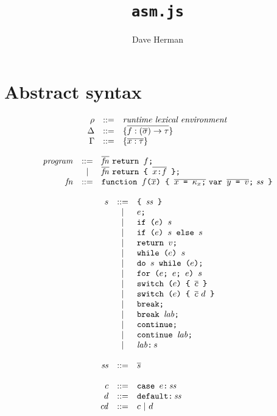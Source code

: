\documentclass{article}
\newcommand{\funty}[2]{({#1}) \rightarrow {#2}}
\newcommand{\seq}[1]{\overline{{#1}}}
\newcommand{\mathjs}[1]{\mbox{\texttt{{#1}}}}
\newcommand{\return}[1]{\mathjs{return }{#1}\mathjs{;}}
\newcommand{\fun}[3]{\mathjs{function }{#1}\mathjs{(}{#2}\mathjs{) \{ }{#3}\mathjs{ \}}}
\newcommand{\var}[1]{\mathjs{var }{#1}\mathjs{;}}
\newcommand{\while}[2]{\mathjs{while (}{#1}\mathjs{) }{#2}}
\newcommand{\dowhile}[2]{\mathjs{do }{#1}\mathjs{ while (}{#2}\mathjs{);}}
\newcommand{\for}[4]{\mathjs{for (}{#1}\mathjs{; }{#2}\mathjs{; }{#3}\mathjs{) }{#4}}
\newcommand{\switch}[2]{\mathjs{switch (}{#1}\mathjs{) \{ }{#2}\mathjs{ \}}}
\newcommand{\brk}{\mathjs{break;}}
\newcommand{\brkl}[1]{\mathjs{break }{#1}\mathjs{;}}
\newcommand{\cont}{\mathjs{continue;}}
\newcommand{\contl}[1]{\mathjs{continue }{#1}\mathjs{;}}
\newcommand{\lab}[2]{{#1}\mathjs{:}\,{#2}}
\newcommand{\ifthen}[2]{\mathjs{if (}{#1}\mathjs{) }{#2}}
\newcommand{\ifthenelse}[3]{\mathjs{if (}{#1}\mathjs{) }{#2}\mathjs{ else }{#3}}
\newcommand{\block}[1]{\mathjs{\{ }{#1}\mathjs{ \}}}
\begin{document}
\title{\texttt{asm.js}}
\author{Dave Herman}
\maketitle

\section{Abstract syntax}

\[
\begin{array}{rcl}
\rho & ::= & \mbox{\textit{runtime lexical environment}} \\
\Delta & ::= & \{ \seq{f : \funty{\seq{\sigma}}{\tau} } \} \\
\Gamma & ::= & \{ \seq{x : \tau} \} \\
\end{array}
\]

\[
\begin{array}{rcl}
\mathit{program} & ::= & \seq{\mathit{fn}}\ \return{f} \\
                 &  |  & \seq{\mathit{fn}}\ \return{\mathjs{\{ } \seq{x \mathjs{:} f} \mathjs{ \}}} \\
\mathit{fn} & ::= & \fun{f}{\seq{x}}{\seq{x\mathjs{ = }\kappa_x\mathjs{;}}\ \var{\seq{y\mathjs{ = }v}}\ \mathit{ss}} \\
\end{array}
\]

\[
\begin{array}{rcl}
s & ::= & \block{\mathit{ss}} \\
  &  |  & e\mathjs{;} \\
  &  |  & \ifthen{e}{s} \\
  &  |  & \ifthenelse{e}{s}{s} \\
  &  |  & \return{v} \\
  &  |  & \while{e}{s} \\
  &  |  & \dowhile{s}{e} \\
  &  |  & \for{e}{e}{e}{s} \\
  &  |  & \switch{e}{\seq{c}} \\
  &  |  & \switch{e}{\seq{c}\ d} \\
  &  |  & \brk \\
  &  |  & \brkl{\mathit{lab}} \\
  &  |  & \cont \\
  &  |  & \contl{\mathit{lab}} \\
  &  |  & \lab{\mathit{lab}}{s} \\
\\
\mathit{ss} & ::= & \seq{s} \\
\\
c & ::= & \mathjs{case }e\mathjs{:}\,\mathit{ss} \\
d & ::= & \mathjs{default:}\,\mathit{ss} \\
\mathit{cd} & ::= & c ~|~ d \\
\end{array}
\]
\end{document}
